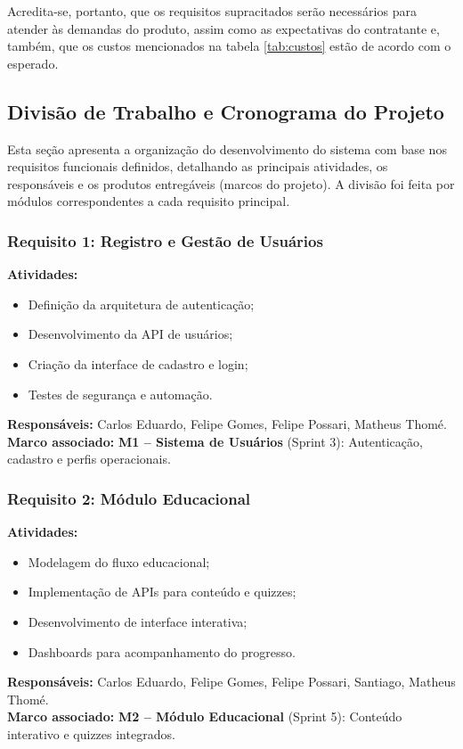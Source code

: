 \documentclass[a4paper, 12pt]{article}
\begin{document}
Acredita-se, portanto, que os requisitos supracitados serão necessários para atender às demandas do produto, assim como as expectativas do contratante e, também, que os custos mencionados na tabela \ref{tab:custos} estão de acordo com o esperado.

\newpage



\subsection{Divisão de Trabalho e Cronograma do Projeto}
\label{sec:trabalho-cronograma}

Esta seção apresenta a organização do desenvolvimento do sistema com base nos requisitos funcionais definidos, detalhando as principais atividades, os responsáveis e os produtos entregáveis (marcos do projeto). A divisão foi feita por módulos correspondentes a cada requisito principal.

\subsubsection*{Requisito 1: Registro e Gestão de Usuários}
\textbf{Atividades:}
\begin{itemize}
  \item Definição da arquitetura de autenticação;
  \item Desenvolvimento da API de usuários;
  \item Criação da interface de cadastro e login;
  \item Testes de segurança e automação.
\end{itemize}
\textbf{Responsáveis:} Carlos Eduardo, Felipe Gomes, Felipe Possari, Matheus Thomé. \\
\textbf{Marco associado:} \textbf{M1 – Sistema de Usuários} (Sprint 3): Autenticação, cadastro e perfis operacionais.

\subsubsection*{Requisito 2: Módulo Educacional}
\textbf{Atividades:}
\begin{itemize}
  \item Modelagem do fluxo educacional;
  \item Implementação de APIs para conteúdo e quizzes;
  \item Desenvolvimento de interface interativa;
  \item Dashboards para acompanhamento do progresso.
\end{itemize}
\textbf{Responsáveis:} Carlos Eduardo, Felipe Gomes, Felipe Possari, Santiago, Matheus Thomé. \\
\textbf{Marco associado:} \textbf{M2 – Módulo Educacional} (Sprint 5): Conteúdo interativo e quizzes integrados.
\end{document}
